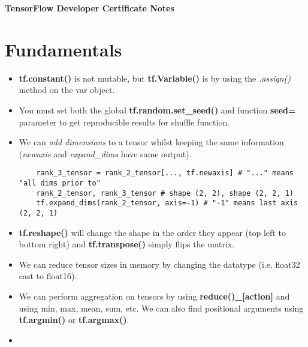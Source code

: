 \documentclass[11pt, a4paper]{article}
\begin{document}
	\begin{titlepage}
		\begin{center} \Huge \textbf{TensorFlow Developer Certificate Notes} \end{center}
		\tableofcontents
		\newpage
	\end{titlepage}
	
	
	\section{Fundamentals}
	\begin{itemize}
		\item \textbf{tf.constant()} is not mutable, but \textbf{tf.Variable()} is by using the \textit{.assign()} method on the var object.
		\item You must set both the global \textbf{tf.random.set\_seed()} and function \textbf{seed=} parameter to get reproducible results for shuffle function.
		\item We can \textit{add dimensions} to a tensor whilst keeping the same information (\textit{newaxis} and \textit{expand\_dims} have same output).
	\begin{lstlisting}
	rank_3_tensor = rank_2_tensor[..., tf.newaxis] # "..." means "all dims prior to"
	rank_2_tensor, rank_3_tensor # shape (2, 2), shape (2, 2, 1) 
	tf.expand_dims(rank_2_tensor, axis=-1) # "-1" means last axis (2, 2, 1)  \end{lstlisting}
		\item \textbf{tf.reshape()} will change the shape in the order they appear (top left to bottom right) and \textbf{tf.transpose()} simply flips the matrix.
		\item We can reduce tensor sizes in memory by changing the datatype (i.e. float32 cast to float16). 
		\item We can perform aggregation on tensors by using \textbf{reduce()\_[action]} and using min, max, mean, sum, etc. We can also find positional arguments using \textbf{tf.argmin()} or \textbf{tf.argmax()}.
		\item 
	\end{itemize}
	
	
	
\end{document}
